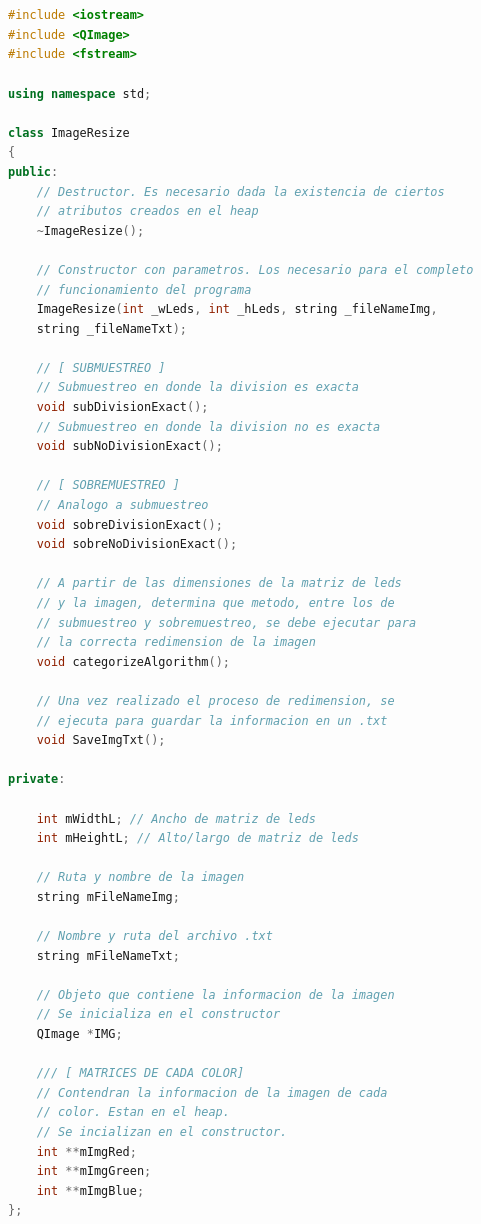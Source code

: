 \documentclass{article}
\begin{document}
\begin{lstlisting}[language=C++, label=codigo_matrices_int]


#include <iostream>
#include <QImage>
#include <fstream>

using namespace std;

class ImageResize
{
public:
    // Destructor. Es necesario dada la existencia de ciertos
    // atributos creados en el heap
    ~ImageResize();
    
    // Constructor con parametros. Los necesario para el completo 
    // funcionamiento del programa
    ImageResize(int _wLeds, int _hLeds, string _fileNameImg, 
    string _fileNameTxt);

    // [ SUBMUESTREO ]
    // Submuestreo en donde la division es exacta
    void subDivisionExact();
    // Submuestreo en donde la division no es exacta
    void subNoDivisionExact();

    // [ SOBREMUESTREO ]
    // Analogo a submuestreo
    void sobreDivisionExact();
    void sobreNoDivisionExact();
    
    // A partir de las dimensiones de la matriz de leds
    // y la imagen, determina que metodo, entre los de 
    // submuestreo y sobremuestreo, se debe ejecutar para 
    // la correcta redimension de la imagen
    void categorizeAlgorithm();
    
    // Una vez realizado el proceso de redimension, se 
    // ejecuta para guardar la informacion en un .txt
    void SaveImgTxt();
    
private:

    int mWidthL; // Ancho de matriz de leds
    int mHeightL; // Alto/largo de matriz de leds
    
    // Ruta y nombre de la imagen
    string mFileNameImg; 
    
    // Nombre y ruta del archivo .txt
    string mFileNameTxt;
    
    // Objeto que contiene la informacion de la imagen
    // Se inicializa en el constructor
    QImage *IMG; 

    /// [ MATRICES DE CADA COLOR]
    // Contendran la informacion de la imagen de cada 
    // color. Estan en el heap.
    // Se incializan en el constructor.
    int **mImgRed;
    int **mImgGreen;
    int **mImgBlue;
};

\end{lstlisting}
\end{document}
